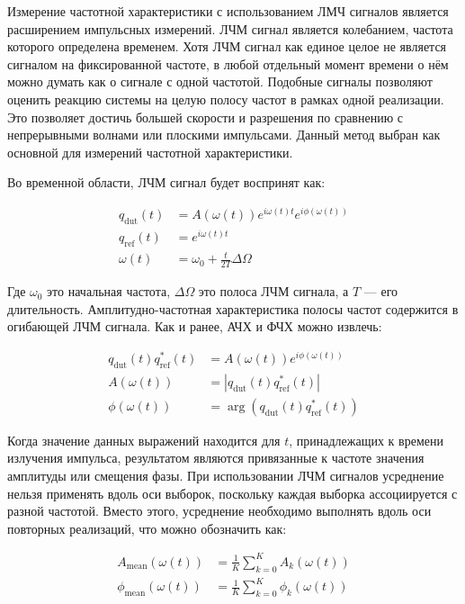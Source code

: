 \documentclass{report}
\begin{document}
Измерение частотной характеристики с использованием ЛМЧ сигналов является расширением импульсных измерений. ЛЧМ сигнал является колебанием, частота которого определена временем. Хотя ЛЧМ сигнал как единое целое не является сигналом на фиксированной частоте, в любой отдельный момент времени о нём можно думать как о сигнале с одной частотой. Подобные сигналы позволяют оценить реакцию системы на целую полосу частот в рамках одной реализации. Это позволяет достичь большей скорости и разрешения по сравнению с непрерывными волнами или плоскими импульсами. Данный метод выбран как основной для измерений частотной характеристики.

Во временной области, ЛЧМ сигнал будет воспринят как:

\begin{align}
q_\text{dut}(t) &= A(\omega(t)) e^{i \omega(t) t} e^{i \phi(\omega(t)) } \\
q_\text{ref}(t) &= e^{i \omega(t) t} \\
\omega(t) &= \omega_0 + \frac{t}{2T} \Delta \Omega
\end{align}

Где $\omega_0$ это начальная частота, $\Delta \Omega$ это полоса ЛЧМ сигнала, а $T$ --- его длительность. Амплитудно-частотная характеристика полосы частот содержится в огибающей ЛЧМ сигнала. Как и ранее, АЧХ и ФЧХ можно извлечь:

\begin{align}
q_\text{dut}(t) q^*_\text{ref}(t) &= A(\omega(t)) e^{i \phi(\omega(t)) } \\
A(\omega(t)) &= \left| q_\text{dut}(t) q^*_\text{ref}(t) \right| \\
\phi(\omega(t)) &= \arg\left( q_\text{dut}(t) q^*_\text{ref}(t) \right)
\end{align}

Когда значение данных выражений находится для $t$, принадлежащих к времени излучения импульса, результатом являются привязанные к частоте значения амплитуды или смещения фазы. При использовании ЛЧМ сигналов усреднение нельзя применять вдоль оси выборок, поскольку каждая выборка ассоциируется с разной частотой. Вместо этого, усреднение необходимо выполнять вдоль оси повторных реализаций, что можно обозначить как:

\begin{align}
A_\text{mean}(\omega(t)) &= \frac{1}{K} \sum_{k=0}^{K} A_k(\omega(t)) \\
\phi_\text{mean}(\omega(t)) &= \frac{1}{K} \sum_{k=0}^{K} \phi_k(\omega(t))
\end{align}
\end{document}
